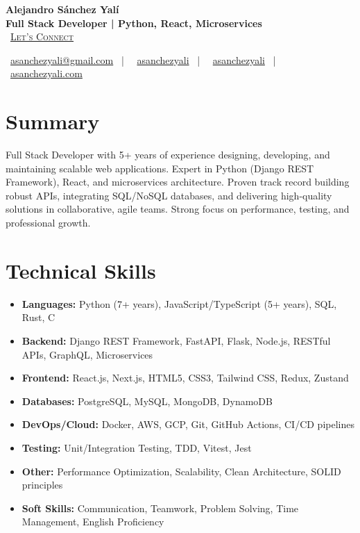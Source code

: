 \documentclass[letterpaper,11pt]{article}
\newcommand{\normalfaCalendar}{{\mdseries\faCalendar}}
\newcommand{\normalfaEnvelope}{{\mdseries\faEnvelope}}
\newcommand{\normalfaLinkedin}{{\mdseries\faLinkedin}}
\newcommand{\normalfaGithub}{{\mdseries\faGithub}}
\newcommand{\normalfaGlobe}{{\mdseries\faGlobe}}
\begin{document}
\begin{center}
\textbf{\Huge Alejandro Sánchez Yalí}\\[0.3em]
\textbf{\Large Full Stack Developer | Python, React, Microservices}\\[0.5em]
\small
\normalfaCalendar\ \href{https://cal.com/asanchezyali/full-time-opportunities}{\textsc{Let's Connect}}

\vspace{1em}
\normalfaEnvelope\ \href{mailto:asanchezyali@gmail.com}{asanchezyali@gmail.com}  ~|~
\normalfaLinkedin\ \href{https://www.linkedin.com/in/asanchezyali}{asanchezyali} ~|~
\normalfaGithub\ \href{https://github.com/asanchezyali}{asanchezyali}  ~|~
\normalfaGlobe\ \href{https://asanchezyali.com}{asanchezyali.com}
\end{center}

\section{Summary}
Full Stack Developer with 5+ years of experience designing, developing, and maintaining scalable web applications. Expert in Python (Django REST Framework), React, and microservices architecture. Proven track record building robust APIs, integrating SQL/NoSQL databases, and delivering high-quality solutions in collaborative, agile teams. Strong focus on performance, testing, and professional growth.

\section{Technical Skills}
\begin{itemize}[leftmargin=*]
  \item \textbf{Languages:} Python (7+ years), JavaScript/TypeScript (5+ years), SQL, Rust, C
  \item \textbf{Backend:} Django REST Framework, FastAPI, Flask, Node.js, RESTful APIs, GraphQL, Microservices
  \item \textbf{Frontend:} React.js, Next.js, HTML5, CSS3, Tailwind CSS, Redux, Zustand
  \item \textbf{Databases:} PostgreSQL, MySQL, MongoDB, DynamoDB
  \item \textbf{DevOps/Cloud:} Docker, AWS, GCP, Git, GitHub Actions, CI/CD pipelines
  \item \textbf{Testing:} Unit/Integration Testing, TDD, Vitest, Jest
  \item \textbf{Other:} Performance Optimization, Scalability, Clean Architecture, SOLID principles
  \item \textbf{Soft Skills:} Communication, Teamwork, Problem Solving, Time Management, English Proficiency
\end{itemize}
\end{document}
